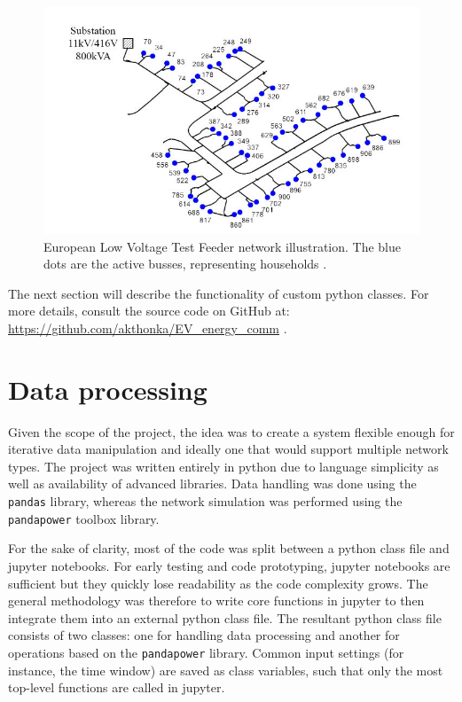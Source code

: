 \documentclass[a4paper,10pt]{report}
\begin{document}
\begin{figure}[htpb]
	\centering
	\includegraphics[width=0.6\linewidth]{EU_LV_test_feeder}
	\caption[European Low Voltage Test Feeder layout]{European Low Voltage Test Feeder network illustration. The blue dots are the active busses, representing households \cite{Nousdilis2017}.}
	\label{EU_LV_test_feeder}
\end{figure}

The next section will describe the functionality of custom python classes. For more details, consult the source code on GitHub at: \url{https://github.com/akthonka/EV_energy_comm} .

\newpage
\section{Data processing}\label{section_data_processing}
Given the scope of the project, the idea was to create a system flexible enough for iterative data manipulation and ideally one that would support multiple network types. The project was written entirely in python due to language simplicity as well as availability of advanced libraries. Data handling was done using the \texttt{pandas} library, whereas the network simulation was performed using the \texttt{pandapower} toolbox library.

For the sake of clarity, most of the code was split between a python class file and jupyter notebooks. For early testing and code prototyping, jupyter notebooks are sufficient but they quickly lose readability as the code complexity grows. The general methodology was therefore to write core functions in jupyter to then integrate them into an external python class file. The resultant python class file consists of two classes: one for handling data processing and another for operations based on the \texttt{pandapower} library. Common input settings (for instance, the time window) are saved as class variables, such that only the most top-level functions are called in jupyter.
\end{document}
